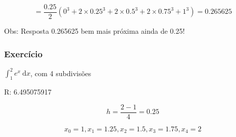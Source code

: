 \documentclass[a4paper]{article}
\newcommand{\ud}{\mathrm{\ d}}
\begin{document}
\begin{displaymath}
  = \frac{0.25}{2}(0^3 + 2\times 0.25^3 + 2\times 0.5^3  +2\times 0.75^3 + 1^3) = 0.265625
\end{displaymath}

Obs: Resposta 0.265625 bem mais próxima ainda de 0.25!

\subsubsection*{Exercício}

$\int_1^2 e^x \ud x$, com 4 subdivisões

R: 6.495075917

\begin{displaymath}
  h = \frac{2-1}{4} = 0.25
\end{displaymath}

\begin{displaymath}
  x_0 = 1, x_1=1.25, x_2=1.5, x_3=1.75, x_4=2
\end{displaymath}
\end{document}
